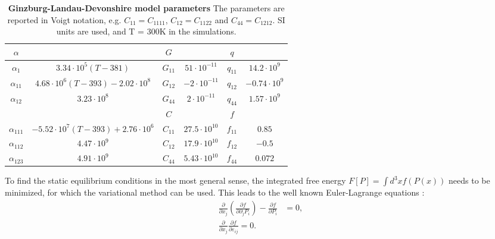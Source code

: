 \begin{table}
\begin{tabular}{|c|c|c|c|c|c|}
	\hline
	 $\alpha$ & & $G$ & & $q$ &\\
	 \hline
	 $\alpha_1$ & $3.34\cdot 10^5 (T - 381)$  & $G_{11}$ & $51 \cdot 10^{-11}$ & $q_{11}$ & $14.2 \cdot 10^{9}$ \\
	 $\alpha_{11}$ & $4.68 \cdot 10^6 (T-393) - 2.02 \cdot 10^8$ & $G_{12}$ & $-2 \cdot 10^{-11}$ & $q_{12}$ & $-0.74 \cdot 10^{9}$ \\
	 $\alpha_{12}$ & $3.23 \cdot 10^8$ & $G_{44}$ & $2 \cdot 10^{-11}$  & $q_{44}$ & $1.57 \cdot 10^{9}$ \\
	 \cline{3-6}
	 & & $C$ & & $f$ &\\
	 \cline{3-6}
	 $\alpha_{111}$ & $-5.52 \cdot 10^7 (T - 393) + 2.76 \cdot 10^6 $ & $C_{11}$ & $27.5 \cdot 10^{10}$ & $f_{11}$ & $0.85$ \\
	 $\alpha_{112}$ &  $4.47 \cdot 10^9 $ & $C_{12}$ & $17.9 \cdot 10^{10}$ & $f_{12}$ & $-0.5$  \\
	 $\alpha_{123}$ & $4.91 \cdot 10^9$ &$C_{44}$ & $5.43 \cdot 10^{10}$ & $f_{44}$ & $ 0.072$ \\
	 \hline
\end{tabular}
\caption{{\bf Ginzburg-Landau-Devonshire model parameters} The parameters are reported in Voigt notation, e.g. $C_{11} = C_{1111}$, $C_{12} = C_{1122}$ and $C_{44}= C_{1212}$.  SI units are used, and T = 300K in the simulations.\label{tab:BTO_param}}
\end{table}

To find the static equilibrium conditions in the most general sense, the integrated free energy $F[P] = \int d^3x f(P(x))$ needs to be minimized, for which the variational method can be used.
This leads to the well known Euler-Lagrange equations \cite{Cao1991, Marton2010}:
\begin{align}
	\label{eq:BTO_euler}
	\frac{\partial}{\partial x_j}\left( \frac{\partial f}{\partial \partial_j P_i}\right) - \frac{\partial f}{\partial P_i} &= 0, \\
	\frac{\partial}{\partial x_j}\frac{\partial f}{\partial \varepsilon_{ij}} = 0.
\end{align}

